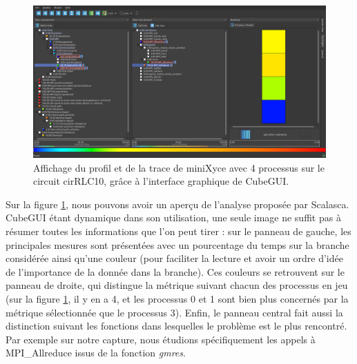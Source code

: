 \documentclass[11pt,a4paper,oneside]{memoir}
\theoremstyle{definition}
\theoremstyle{remark}
\theoremstyle{plain}
\begin{document}
\begin{figure}
\begin{center}
\includegraphics[scale=0.3]{Images-Rapport/cubeGUI.png}
\caption{Affichage du profil et de la trace de miniXyce avec 4 processus sur le circuit cirRLC10, grâce à l'interface graphique de CubeGUI.}
\label{cubeGUI}
\end{center}
\end{figure}

Sur la figure \ref{cubeGUI}, nous pouvons avoir un aperçu de l'analyse proposée par Scalasca. CubeGUI étant dynamique dans son utilisation, une seule image ne suffit pas à résumer toutes les informations que l'on peut tirer : sur le panneau de gauche, les principales mesures sont présentées avec un pourcentage du temps sur la branche considérée ainsi qu'une couleur (pour faciliter la lecture et avoir un ordre d'idée de l'importance de la donnée dans la branche). Ces couleurs se retrouvent sur le panneau de droite, qui distingue la métrique suivant chacun des processus en jeu (sur la figure \ref{cubeGUI}, il y en a 4, et les processus 0 et 1 sont bien plus concernés par la métrique sélectionnée que le processus 3). Enfin, le panneau central fait aussi la distinction suivant les fonctions dans lesquelles le problème est le plus rencontré. Par exemple sur notre capture, nous étudions spécifiquement les appels à MPI\_Allreduce issus de la fonction \textit{gmres}.
\end{document}
